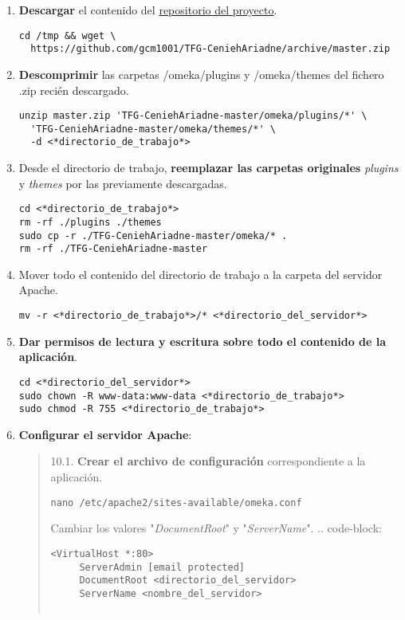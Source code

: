 \begin{enumerate}
{  datos} (anotados en el paso 1).
\begin{verbatim}
cd <directorio_de_trabajo>
nano db.ini
\end{verbatim}
  No es necesario modificar los parámetros `prefix` o `port`.
\begin{verbatim}
[database]
host     = "localhost"
username = "usuario"
password = "contraseña"
dbname   = "omekadb"
prefix   = "omeka_"
charset  = "utf8"
;port     = ""
\end{verbatim}
\item
  \textbf{Descargar} el contenido del
  \href{https://github.com/gcm1001/TFG-CeniehAriadne}{repositorio del
  proyecto}.
\begin{verbatim}
cd /tmp && wget \
  https://github.com/gcm1001/TFG-CeniehAriadne/archive/master.zip
\end{verbatim}
\item
  \textbf{Descomprimir} las carpetas {/omeka/plugins} y {/omeka/themes}
  del fichero {.zip} recién descargado.
\begin{verbatim}
unzip master.zip 'TFG-CeniehAriadne-master/omeka/plugins/*' \
  'TFG-CeniehAriadne-master/omeka/themes/*' \
  -d <*directorio_de_trabajo*>
\end{verbatim}
\item
  Desde el directorio de trabajo, \textbf{reemplazar las carpetas
  originales} \emph{plugins} y \emph{themes} por las previamente
  descargadas.
\begin{verbatim}
cd <*directorio_de_trabajo*>
rm -rf ./plugins ./themes
sudo cp -r ./TFG-CeniehAriadne-master/omeka/* .
rm -rf ./TFG-CeniehAriadne-master
\end{verbatim}
\item
  Mover todo el contenido del directorio de trabajo a la carpeta del
  servidor Apache.
\begin{verbatim}
mv -r <*directorio_de_trabajo*>/* <*directorio_del_servidor*>
\end{verbatim}
\item
  \textbf{Dar permisos de lectura y escritura sobre todo el contenido de
  la aplicación}.
\begin{verbatim}
cd <*directorio_del_servidor*>
sudo chown -R www-data:www-data <*directorio_de_trabajo*>
sudo chmod -R 755 <*directorio_de_trabajo*>
\end{verbatim}
\item
  \textbf{Configurar el servidor Apache}:
\begin{quote}
10.1. \textbf{Crear el archivo de configuración} correspondiente a la
aplicación.
\begin{verbatim}
nano /etc/apache2/sites-available/omeka.conf
\end{verbatim}
Cambiar los valores "\emph{DocumentRoot}" y "\emph{ServerName}". ..
code-block:
\begin{verbatim}
<VirtualHost *:80>
     ServerAdmin [email protected]
     DocumentRoot <directorio_del_servidor>
     ServerName <nombre_del_servidor>


\end{verbatim}
\end{quote}
\end{enumerate}
